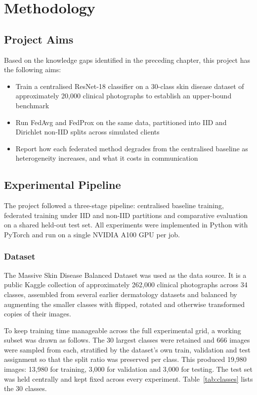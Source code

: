 \documentclass[12pt,openany,a4paper]{book}
\begin{document}
\chapter{Methodology}

\section{Project Aims}
Based on the knowledge gaps identified in the preceding chapter, this project has the following aims:
\begin{itemize}
  \item Train a centralised ResNet-18 classifier on a 30-class skin disease dataset of approximately 20,000 clinical photographs to establish an upper-bound benchmark
  \item Run FedAvg and FedProx on the same data, partitioned into IID and Dirichlet non-IID splits across simulated clients
  \item Report how each federated method degrades from the centralised baseline as heterogeneity increases, and what it costs in communication
\end{itemize}

\section{Experimental Pipeline}
The project followed a three-stage pipeline: centralised baseline training, federated training under IID and non-IID partitions and comparative evaluation on a shared held-out test set. All experiments were implemented in Python with PyTorch and run on a single NVIDIA A100 GPU per job.

\subsection{Dataset}
The Massive Skin Disease Balanced Dataset \cite{MassiveSkinDisease} was used as the data source. It is a public Kaggle collection of approximately 262,000 clinical photographs across 34 classes, assembled from several earlier dermatology datasets and balanced by augmenting the smaller classes with flipped, rotated and otherwise transformed copies of their images.

To keep training time manageable across the full experimental grid, a working subset was drawn as follows. The 30 largest classes were retained and 666 images were sampled from each, stratified by the dataset's own train, validation and test assignment so that the split ratio was preserved per class. This produced 19,980 images: 13,980 for training, 3,000 for validation and 3,000 for testing. The test set was held centrally and kept fixed across every experiment. Table~\ref{tab:classes} lists the 30 classes.
\end{document}
